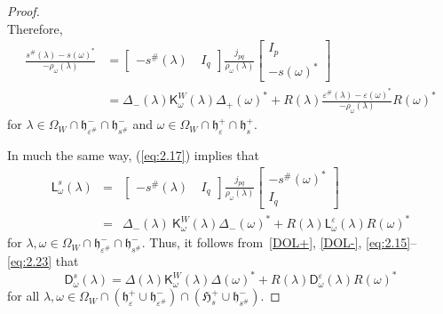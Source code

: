 \documentclass[12pt,twoside,a4paper]{amsart}
\theoremstyle{definition}
\numberwithin{equation}{section}
\begin{document}
\begin{proof}
\begin{equation}
\end{equation}
Therefore,
\begin{equation}\label{eq:2.19}
   \begin{split}
   \frac{s^\#({\lambda})-s(\omega)^*}{-\rho_\omega({\lambda})}&=
   \begin{bmatrix}-s^\#({\lambda})&\ I_q\end{bmatrix}
       {\displaystyle\frac{j_{pq}}{\rho_\omega({\lambda})}}\begin{bmatrix}I_p\\
      -s(\omega)^*
    \end{bmatrix}\\
&=\Delta_-({\lambda}){\mathsf K}^W_\omega({\lambda})\Delta_+(\omega)^*+R({\lambda})
\frac{\varepsilon^\#({\lambda})-\varepsilon(\omega)^*}{-\rho_\omega({\lambda})}
R({\omega})^*
\end{split}
\end{equation}
for ${\lambda}\in \Omega_W\cap {{\mathfrak h}}_{\varepsilon^\#}^-\cap{\mathfrak
h}_{s^{\#}}^-$ and $\omega\in\Omega_W\cap{\mathfrak
h}_\varepsilon^+\cap{\mathfrak h}_s^+$.

In much the same way, (\ref{eq:2.17}) implies that
\begin{eqnarray}\label{eq:2.23}
{\mathsf L}^s_\omega({\lambda})&=& \begin{bmatrix}-s^\#({\lambda})&\
I_q\end{bmatrix} \frac{j_{pq}}{\rho_\omega({\lambda})}\left[
\begin{array}{c}
-s^\#(\omega)^*\\
I_q
\end{array}\right]\nonumber\\
&=& \Delta_-({\lambda})\ {\mathsf
K}^W_\omega({\lambda})\Delta_-(\omega)^*+R({\lambda}){\mathsf
L}^\varepsilon_\omega({\lambda})R(\omega)^*
\end{eqnarray}
for ${\lambda},\omega \in
 \Omega_W\cap {{\mathfrak h}}_{\varepsilon^\#}^-\cap{\mathfrak h}_{s^{\#}}^-$.
Thus, it follows from~\eqref{DOL+}, \eqref{DOL-},
\eqref{eq:2.15}--\eqref{eq:2.23} that
\begin{equation}\label{eq:2.21}
    {\mathsf D}^s_\omega({\lambda})=\Delta({\lambda})
    {\mathsf K}^W_\omega({\lambda})\Delta(\omega)^*+
    R({\lambda}){\mathsf D}^\varepsilon_\omega({\lambda})R(\omega)^*
\end{equation}
for all ${\lambda},\omega\in
\Omega_W\cap({{\mathfrak h}}_\varepsilon^+\cup{{\mathfrak h}}_{\varepsilon^\#}^-)\cap({\mathfrak
H}_s^+\cup {\mathfrak h}_{s^{\#}}^-)$.


\end{proof}
\end{document}
